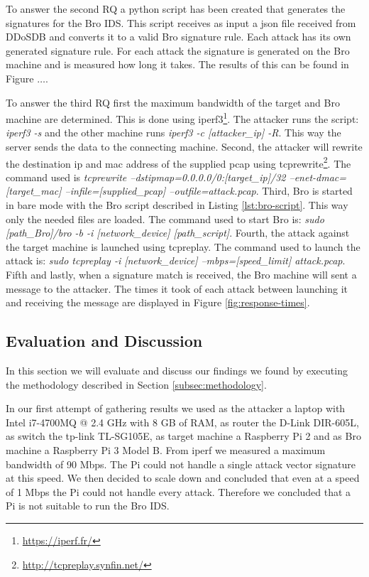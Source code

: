 To answer the second RQ a python script has been created that generates the signatures for the Bro IDS. This script receives as input a json file received from DDoSDB and converts it to a valid Bro signature rule. Each attack has its own generated signature rule. For each attack the signature is generated on the Bro machine and is measured how long it takes. The results of this can be found in Figure $\dots$.

To answer the third RQ first the maximum bandwidth of the target and Bro machine are determined. This is done using iperf3\footnote{\url{https://iperf.fr/}}. The attacker runs the script: \emph{iperf3 -s} and the other machine runs \emph{iperf3 -c [attacker\_ip] -R}. This way the server sends the data to the connecting machine. Second, the attacker will rewrite the destination ip and mac address of the supplied pcap using tcprewrite\footnote{\url{http://tcpreplay.synfin.net/}}. The command used is \emph{tcprewrite --dstipmap=0.0.0.0/0:[target\_ip]/32 --enet-dmac=[target\_mac] --infile=[supplied\_pcap] --outfile=attack.pcap}. Third, Bro is started in bare mode with the Bro script described in Listing \ref{lst:bro-script}. This way only the needed files are loaded. The command used to start Bro is: \emph{sudo [path\_Bro]/bro -b -i [network\_device] [path\_script]}. Fourth, the attack against the target machine is launched using tcpreplay. The command used to launch the attack is: \emph{sudo tcpreplay -i [network\_device] --mbps=[speed\_limit] attack.pcap}. Fifth and lastly, when a signature match is received, the Bro machine will sent a message to the attacker. The times it took of each attack between launching it and receiving the message are displayed in Figure \ref{fig:response-times}.






\subsection{Evaluation and Discussion}\label{subsec:evaluation-discussion}
In this section we will evaluate and discuss our findings we found by executing the methodology described in Section \ref{subsec:methodology}.

In our first attempt of gathering results we used as the attacker a laptop with Intel i7-4700MQ @ 2.4 GHz with 8 GB of RAM, as router the D-Link DIR-605L, as switch the tp-link TL-SG105E, as target machine a Raspberry Pi 2 and as Bro machine a Raspberry Pi 3 Model B. From iperf we measured a maximum bandwidth of 90 Mbps. The Pi could not handle a single attack vector signature at this speed. We then decided to scale down and concluded that even at a speed of 1 Mbps the Pi could not handle every attack. Therefore we concluded that a Pi is not suitable to run the Bro IDS.  

